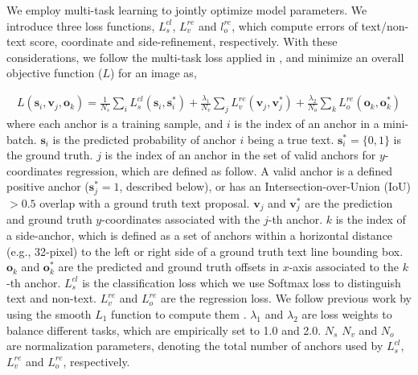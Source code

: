 \documentclass[runningheads]{llncs}
\begin{document}
We employ multi-task learning to jointly optimize model parameters. We introduce three loss functions, $L^{cl}_s$, $L^{re}_v$ and $l^{re}_o$, which compute errors of text/non-text score, coordinate and side-refinement, respectively.  With these considerations, we follow the multi-task loss applied in  \cite{Girshick2015,Ren2015}, and minimize an overall objective function ($L$) for an image as,

\begin{eqnarray}
L(\textbf{s}_i, \textbf{v}_j, \textbf{o}_k) =\frac1{N_{s}}\sum_iL^{cl}_{s}(\textbf{s}_i, \textbf{s}_i^*)
+\frac{\lambda_1}{N_v}\sum_j L^{re}_v(\textbf{v}_j, \textbf{v}_j^*)
+\frac{\lambda_2}{N_o}\sum_k L^{re}_o(\textbf{o}_k, \textbf{o}_k^*)
\end{eqnarray}
where each anchor is a training sample, and $i$ is the index of an anchor in a mini-batch. $\textbf{s}_i$ is the predicted probability of anchor $i$ being a true text. 
$\textbf{s}_i^*=\{0,1\}$ is the ground truth. 
$j$ is the index of an anchor in the set of valid anchors for $y$-coordinates regression, which are defined as follow.
A valid anchor is a defined positive anchor ($\textbf{s}_j^*=1$, described below), or has an Intersection-over-Union (IoU) $>0.5$ overlap  with a ground truth text proposal.
$\textbf{v}_j$ and $\textbf{v}_j^*$ are the prediction and ground truth $y$-coordinates associated with the $j$-{th} anchor.
$k$ is the index of a side-anchor, which is defined as a set of anchors within a horizontal distance (e.g.,  32-pixel) to the left or right side of a ground truth text line bounding box.
$\textbf{o}_k$ and $\textbf{o}_k^*$ are the predicted and ground truth offsets in $x$-axis associated to the $k$-{th} anchor.
$L^{cl}_s$ is the classification loss which we use Softmax loss to distinguish text and non-text. $L^{re}_v$ and $L^{re}_o$ are the regression loss. 
We follow previous work by using the smooth $L_1$ function to compute them \cite{Girshick2015,Ren2015}.
$\lambda_1$ and $\lambda_2$ are loss weights to balance different tasks, which are empirically set to 1.0 and 2.0.  $N_{s}$ $N_{v}$ and $N_{o}$ are normalization parameters, denoting the total number of anchors used by $L^{cl}_s$, $L^{re}_v$ and $L^{re}_o$, respectively.

\end{document}

